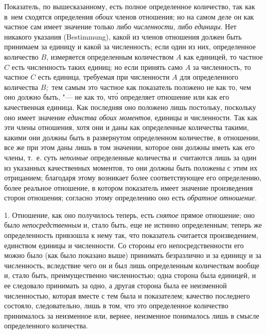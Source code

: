 Показатель, по вышесказанному, есть полное определенное количество, так как
в~нем сходятся определения {\em обоих} членов отношения; но на самом деле он
как частное сам имеет значение только либо {\em численности}, либо
{\em единицы}. Нет никакого указания (Bestimmung), какой из членов отношения
должен быть принимаем за единицу и какой за численность; если один из них,
определенное количество $B$, измеряется определенным количеством $A$ как
единицей, то частное $C$ есть численность таких единиц; но если принять само
$A$ за численность, то частное $C$ есть единица, требуемая при численности $A$
для определенного количества $B${\em ;\,} тем самым это частное как показатель
положено не как то, чем оно должно быть, "--- не как то, чт\'{о} определяет
отношение или как его качественная единица. Как последняя оно положено лишь
постольку, поскольку оно имеет значение {\em единства обоих моментов}, единицы
и численности. Так как эти члены отношения, хотя они и даны как определенные
количества такими, какими они должны быть в развернутом определенном
количестве, в отношении, все же при этом даны лишь в том значении, которое они
должны иметь как его члены, т.~е. суть {\em неполные} определенные количества
и~считаются лишь за один из указанных качественных моментов, то они должны быть
положены с этим их отрицанием; благодаря этому возникает более соответствующее
его определению, более реальное отношение, в котором показатель имеет значение
произведения сторон отношения; согласно этому определению оно есть
{\em обратное отношение}.


1. Отношение, как оно получилось теперь, есть {\em снятое} прямое отношение;
оно было {\em непосредственным} и, стало быть, еще не истинно определенным;
теперь же определенность привзошла к нему так, что показатель считается
произведением, единством единицы и численности. Со стороны его
непосредственности его можно было (как было показано выше) принимать
безразлично и за единицу и за численность, вследствие чего он и был лишь
определенным количествам вообще и, стало быть, преимущественно численностью;
одна сторона была единицей, и ее следовало принимать за одно, а другая сторона
была ее неизменной численностью, которая вместе с тем была и показателем;
качество последнего состояло, следовательно, лишь в том, что это определенное
количество принималось за неизменное или, вернее, неизменное понималось лишь в
смысле определенного количества.

